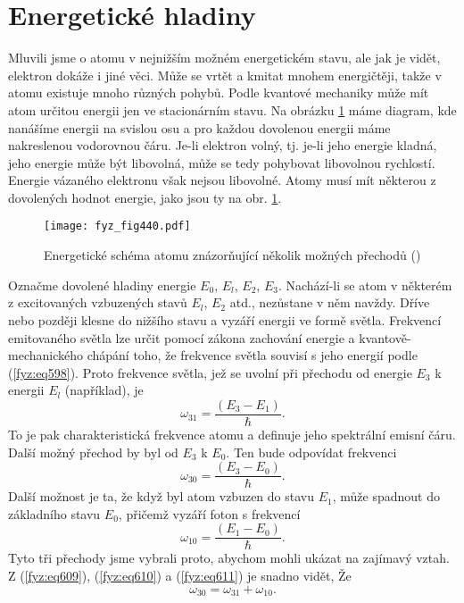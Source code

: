   \section{Energetické hladiny}\label{fyz:IchapXXXVIIIsecV}
    Mluvili jsme o atomu v nejnižším možném energetickém stavu, ale jak je vidět, elektron dokáže i
    jiné věci. Může se vrtět a kmitat mnohem energičtěji, takže v atomu existuje mnoho různých
    pohybů. Podle kvantové mechaniky může mít atom určitou energii jen ve stacionárním stavu. Na
    obrázku \ref{fyz:fig440} máme diagram, kde nanášíme energii na svislou osu a pro každou
    dovolenou energii máme nakreslenou vodorovnou čáru. Je-li elektron volný, tj. je-li jeho energie
    kladná, jeho energie může být libovolná, může se tedy pohybovat libovolnou rychlostí. Energie
    vázaného elektronu však nejsou libovolné. Atomy musí mít některou z dovolených hodnot energie,
    jako jsou ty na obr. \ref{fyz:fig440}.
    \begin{figure}[ht!] %
      \centering
      \texttt{[image: fyz\_fig440.pdf]}
      \caption{Energetické schéma atomu znázorňující několik možných přechodů
              (\cite[s.~518]{Feynman01})}
      \label{fyz:fig440}
    \end{figure}

    Označme dovolené hladiny energie \(E_0\), \(E_l\), \(E_2\), \(E_3\). Nachází-li se atom v
    některém z excitovaných vzbuzených stavů \(E_l\), \(E_2\) atd., nezůstane v něm navždy. Dříve
    nebo později klesne do nižšího stavu a vyzáří energii ve formě světla. Frekvencí emitovaného
    světla lze určit pomocí zákona zachování energie a kvantově-mechanického chápání toho, že
    frekvence světla souvisí s jeho energií podle (\ref{fyz:eq598}). Proto frekvence světla, jež se
    uvolní při přechodu od energie \(E_3\) k energii \(E_l\) (například), je
    \begin{equation}\label{fyz:eq609}
      ω_{31} = \frac{(E_3−E_1)}{ℏ}.
    \end{equation}
    To je pak charakteristická frekvence atomu a definuje jeho spektrální emisní čáru. Další možný
    přechod by byl od \(E_3\) k \(E_0\). Ten bude odpovídat frekvenci
    \begin{equation}\label{fyz:eq610}
      ω_{30} = \frac{(E_3−E_0)}{ℏ}.
    \end{equation}
    Další možnost je ta, že když byl atom vzbuzen do stavu \(E_1\), může spadnout do základního
    stavu \(E_0\), přičemž vyzáří foton s frekvencí
    \begin{equation}\label{fyz:eq611}
      ω_{10} = \frac{(E_1−E_0)}{ℏ}.
    \end{equation}
    Tyto tři přechody jsme vybrali proto, abychom mohli ukázat na zajímavý vztah. Z
    (\ref{fyz:eq609}), (\ref{fyz:eq610}) a (\ref{fyz:eq611}) je snadno vidět, Že
    \begin{equation}\label{fyz:eq612}
      ω_{30} = ω_{31} + ω_{10}.
    \end{equation}

